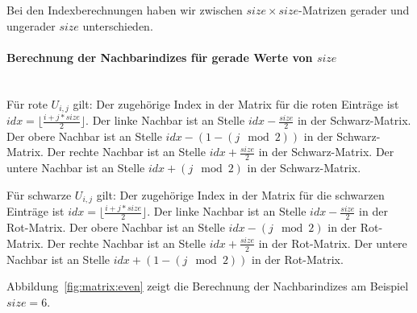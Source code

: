 \documentclass{article}
\begin{document}
Bei den Indexberechnungen haben wir zwischen $size \times size$-Matrizen gerader und ungerader $size$ unterschieden.

\paragraph{Berechnung der Nachbarindizes für gerade Werte von $size$}~\\
Für rote $U_{i,j}$ gilt: Der zugehörige Index in der Matrix für die roten Einträge ist $idx = \lfloor\frac{i+j*size}{2}\rfloor$. Der linke Nachbar ist an Stelle $idx - \frac{size}{2}$ in der Schwarz-Matrix. Der obere Nachbar ist an Stelle $idx - (1-(j \mod 2))$ in der Schwarz-Matrix. Der rechte Nachbar ist an Stelle $idx + \frac{size}{2}$ in der Schwarz-Matrix. Der untere Nachbar ist an Stelle $idx + (j \mod 2)$ in der Schwarz-Matrix.



Für schwarze $U_{i,j}$ gilt: Der zugehörige Index in der Matrix für die schwarzen Einträge ist $idx = \lfloor\frac{i+j*size}{2}\rfloor$. Der linke Nachbar ist an Stelle $idx - \frac{size}{2}$ in der Rot-Matrix. Der obere Nachbar ist an Stelle $idx - (j \mod 2)$ in der Rot-Matrix. Der rechte Nachbar ist an Stelle $idx + \frac{size}{2}$ in der Rot-Matrix. Der untere Nachbar ist an Stelle $idx + (1- (j \mod 2))$ in der Rot-Matrix.

Abbildung~\ref{fig:matrix:even} zeigt die Berechnung der Nachbarindizes am Beispiel $size=6$.
\end{document}
